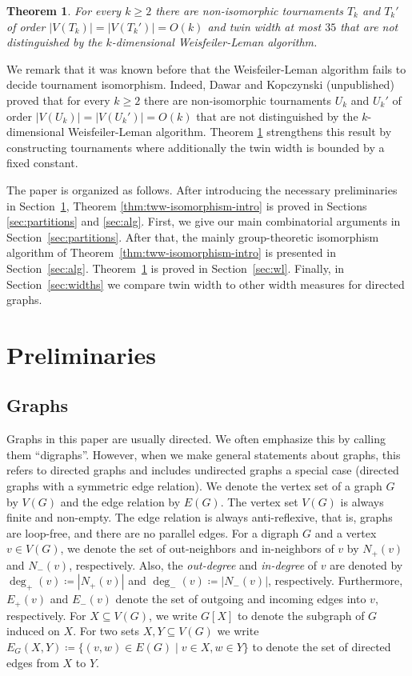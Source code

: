 \PassOptionsToPackage{dvipsnames,svgnames}{xcolor}\documentclass[10pt,a4paper]{article}
\newtheorem{theorem}{Theorem}[section]
\begin{document}
\begin{theorem}
 \label{thm:wl-tournament-tww}
 For every $k \geq 2$ there are non-isomorphic tournaments $T_k$ and $T_k'$ of order $|V(T_k)| = |V(T_k')| = O(k)$ and twin width at most $35$ that are not distinguished by the $k$-dimensional Weisfeiler-Leman algorithm.
\end{theorem}


We remark that it was known before that the Weisfeiler-Leman algorithm fails to decide tournament isomorphism.
Indeed, Dawar and Kopczynski (unpublished) proved that for every $k \geq 2$ there are non-isomorphic tournaments $U_k$ and $U_k'$ of order $|V(U_k)| = |V(U_k')| = O(k)$ that are not distinguished by the $k$-dimensional Weisfeiler-Leman algorithm.
Theorem \ref{thm:wl-tournament-tww} strengthens this result by constructing tournaments where additionally the twin width is bounded by a fixed constant.

The paper is organized as follows.
After introducing the necessary preliminaries in Section~\ref{sec:preliminaries}, Theorem \ref{thm:tww-isomorphism-intro} is proved in Sections \ref{sec:partitions} and \ref{sec:alg}.
First, we give our main combinatorial arguments in Section~\ref{sec:partitions}.
After that, the mainly group-theoretic isomorphism algorithm of Theorem~\ref{thm:tww-isomorphism-intro} is presented in Section~\ref{sec:alg}.
Theorem~\ref{thm:wl-tournament-tww} is proved in Section~\ref{sec:wl}.
Finally, in Section~\ref{sec:widths} we compare twin width to other width measures for directed graphs.


\section{Preliminaries}
\label{sec:preliminaries}

\subsection{Graphs}

Graphs in this paper are usually directed.
We often emphasize this by calling them ``digraphs''.
However, when we make general statements about graphs, this refers to directed graphs and includes undirected graphs a special case (directed graphs with a symmetric edge relation).
We denote the vertex set of a graph $G$ by $V(G)$ and the edge relation by $E(G)$.
The vertex set $V(G)$ is always finite and non-empty.
The edge relation is always anti-reflexive, that is, graphs are loop-free, and there are no parallel edges.
For a digraph $G$ and a vertex $v \in V(G)$, we denote the set of out-neighbors and in-neighbors of $v$ by $N_+(v)$ and $N_-(v)$, respectively.
Also, the \emph{out-degree} and \emph{in-degree} of $v$ are denoted by $\deg_+(v) \coloneqq |N_+(v)|$ and $\deg_-(v) \coloneqq |N_-(v)|$, respectively.
Furthermore, $E_+(v)$ and $E_-(v)$ denote the set of outgoing and incoming edges into $v$, respectively.
For $X\subseteq V(G)$, we write $G[X]$ to denote the subgraph of $G$ induced on $X$.
For two sets $X,Y \subseteq V(G)$ we write $E_G(X,Y) \coloneqq \{(v,w) \in E(G) \mid v \in X, w \in Y\}$ to denote the set of directed edges from $X$ to $Y$.
\end{document}
